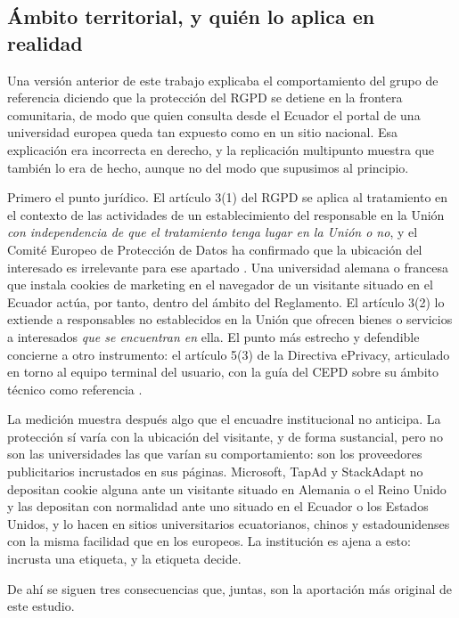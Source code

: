 \documentclass[pdflatex,sn-basic,Numbered]{sn-jnl}
\theoremstyle{thmstyleone}
\theoremstyle{thmstyletwo}
\theoremstyle{thmstylethree}
\begin{document}
\subsection{\'Ambito territorial, y qui\'en lo aplica en realidad}\label{sec:discussion-legal}

Una versi\'on anterior de este trabajo explicaba el comportamiento del grupo de referencia diciendo que la protecci\'on del RGPD se detiene en la frontera comunitaria, de modo que quien consulta desde el Ecuador el portal de una universidad europea queda tan expuesto como en un sitio nacional. Esa explicaci\'on era incorrecta en derecho, y la replicaci\'on multipunto muestra que tambi\'en lo era de hecho, aunque no del modo que supusimos al principio.

Primero el punto jur\'idico. El art\'iculo 3(1) del RGPD se aplica al tratamiento en el contexto de las actividades de un establecimiento del responsable en la Uni\'on \emph{con independencia de que el tratamiento tenga lugar en la Uni\'on o no}, y el Comit\'e Europeo de Protecci\'on de Datos ha confirmado que la ubicaci\'on del interesado es irrelevante para ese apartado \citep{gdpr2016,edpb2019territorial}. Una universidad alemana o francesa que instala cookies de marketing en el navegador de un visitante situado en el Ecuador act\'ua, por tanto, dentro del \'ambito del Reglamento. El art\'iculo 3(2) lo extiende a responsables no establecidos en la Uni\'on que ofrecen bienes o servicios a interesados \emph{que se encuentran en} ella. El punto m\'as estrecho y defendible concierne a otro instrumento: el art\'iculo 5(3) de la Directiva ePrivacy, articulado en torno al equipo terminal del usuario, con la gu\'ia del CEPD sobre su \'ambito t\'ecnico como referencia \citep{eprivacy2002,edpb2024eprivacy}.

La medici\'on muestra despu\'es algo que el encuadre institucional no anticipa. La protecci\'on s\'i var\'ia con la ubicaci\'on del visitante, y de forma sustancial, pero no son las universidades las que var\'ian su comportamiento: son los proveedores publicitarios incrustados en sus p\'aginas. Microsoft, TapAd y StackAdapt no depositan cookie alguna ante un visitante situado en Alemania o el Reino Unido y las depositan con normalidad ante uno situado en el Ecuador o los Estados Unidos, y lo hacen en sitios universitarios ecuatorianos, chinos y estadounidenses con la misma facilidad que en los europeos. La instituci\'on es ajena a esto: incrusta una etiqueta, y la etiqueta decide.

De ah\'i se siguen tres consecuencias que, juntas, son la aportaci\'on m\'as original de este estudio.
\end{document}

